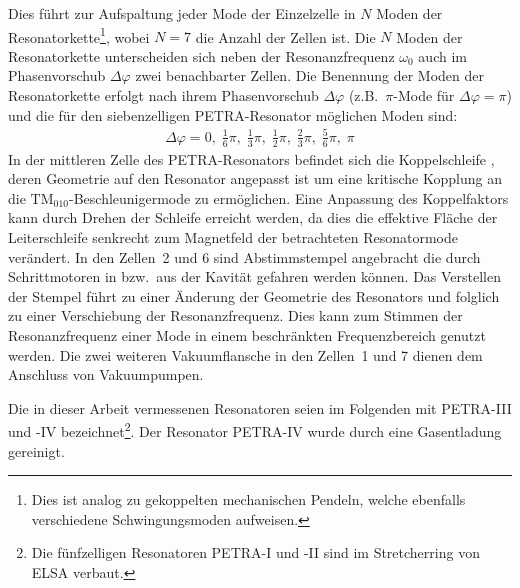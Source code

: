 Dies führt zur Aufspaltung jeder Mode der Einzelzelle in $N$ Moden der Resonatorkette\footnote{Dies ist analog zu gekoppelten mechanischen Pendeln, welche ebenfalls verschiedene Schwingungsmoden aufweisen.}, wobei $N = 7$ die Anzahl der Zellen ist.
Die $N$ Moden der Resonatorkette unterscheiden sich neben der Resonanzfrequenz $\omega_0$ auch im Phasenvorschub $\Delta \varphi$ zwei benachbarter Zellen.
Die Benennung der Moden der Resonatorkette erfolgt nach ihrem Phasenvorschub $\Delta \varphi$ (z.B.\ $\pi$-Mode für $\Delta \varphi = \pi$) und die für den siebenzelligen PETRA-Resonator möglichen Moden sind:
\begin{align}
  \Delta \varphi = 0,\; \frac{1}{6} \pi,\; \frac{1}{3} \pi,\; \frac{1}{2} \pi,\; \frac{2}{3} \pi,\; \frac{5}{6} \pi,\; \pi
\end{align}
In der mittleren Zelle des PETRA-Resonators befindet sich die Koppelschleife \cite{desy_schleife}, deren Geometrie auf den Resonator angepasst ist um eine kritische Kopplung an die $\mathrm{TM}_{010}$-Beschleuniger\-mode zu ermöglichen.
Eine Anpassung des Koppelfaktors kann durch Drehen der Schleife erreicht werden, da dies die effektive Fläche der Leiterschleife senkrecht zum Magnetfeld der betrachteten Resonatormode verändert.
In den Zellen~2 und 6 sind Abstimmstempel \cite{desy_stempel} angebracht die durch Schrittmotoren in bzw.\ aus der Kavität gefahren werden können.
Das Verstellen der Stempel führt zu einer Änderung der Geometrie des Resonators und folglich zu einer Verschiebung der Resonanzfrequenz.
Dies kann zum Stimmen der Resonanzfrequenz einer Mode in einem beschränkten Frequenzbereich genutzt werden.
Die zwei weiteren Vakuumflansche in den Zellen~1 und 7 dienen dem Anschluss von Vakuumpumpen.


Die in dieser Arbeit vermessenen Resonatoren seien im Folgenden mit PETRA-III und -IV bezeichnet\footnote{Die fünfzelligen Resonatoren PETRA-I und -II sind im Stretcherring von ELSA verbaut.}. Der Resonator PETRA-IV wurde durch eine Gasentladung gereinigt.


